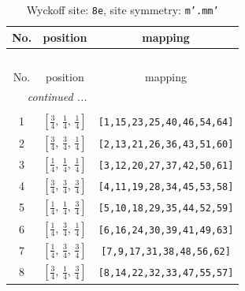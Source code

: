 \documentclass[fleqn,8pt]{jsarticle}
\begin{document}
\renewcommand{\arraystretch}{1.2}
\begin{longtable}{ccc}
\caption{Wyckoff site: {\tt 8e}, site symmetry: {\tt m'.mm'}}
 \\
 \hline \hline
No. & position & mapping \\ \hline \endfirsthead

\multicolumn{2}{l}{\tablename\ \thetable{}} \\
 \hline \hline
No. & position & mapping \\ \hline \endhead

 \hline \hline
\multicolumn{2}{r}{\footnotesize\it continued ...} \\ \endfoot

 \hline \hline
\multicolumn{2}{r}{} \\ \endlastfoot

1 & $\left[ \frac{3}{4},\, \frac{1}{4},\, \frac{1}{4} \right]$ & {\tt [1,15,23,25,40,46,54,64]} \\ \hline
2 & $\left[ \frac{3}{4},\, \frac{3}{4},\, \frac{1}{4} \right]$ & {\tt [2,13,21,26,36,43,51,60]} \\ \hline
3 & $\left[ \frac{1}{4},\, \frac{1}{4},\, \frac{1}{4} \right]$ & {\tt [3,12,20,27,37,42,50,61]} \\ \hline
4 & $\left[ \frac{3}{4},\, \frac{3}{4},\, \frac{3}{4} \right]$ & {\tt [4,11,19,28,34,45,53,58]} \\ \hline
5 & $\left[ \frac{1}{4},\, \frac{1}{4},\, \frac{3}{4} \right]$ & {\tt [5,10,18,29,35,44,52,59]} \\ \hline
6 & $\left[ \frac{1}{4},\, \frac{3}{4},\, \frac{1}{4} \right]$ & {\tt [6,16,24,30,39,41,49,63]} \\ \hline
7 & $\left[ \frac{1}{4},\, \frac{3}{4},\, \frac{3}{4} \right]$ & {\tt [7,9,17,31,38,48,56,62]} \\ \hline
8 & $\left[ \frac{3}{4},\, \frac{1}{4},\, \frac{3}{4} \right]$ & {\tt [8,14,22,32,33,47,55,57]} \\
\end{longtable}
\renewcommand{\arraystretch}{1.2}
\end{document}
